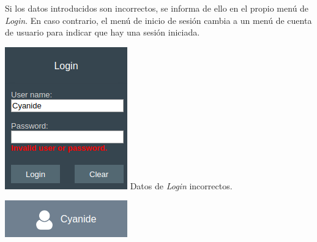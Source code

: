 \documentclass{article}
\newcommand{\myarrow}{\ding{223}}
\begin{document}
\newpage
Si los datos introducidos son incorrectos, se informa de ello en el propio menú de \textit{Login}. En caso contrario, el menú de inicio de sesión cambia a un menú de cuenta de usuario para indicar que hay una sesión iniciada.
\vspace{-12pt}
\begin{center}
    \begin{minipage}[t][][b]{.275\linewidth}
        \includegraphics[width=.91\linewidth]{login2}\newline
        Datos de \textit{Login} incorrectos.
    \end{minipage}
    \hfill
    \begin{minipage}[t][][b]{.275\linewidth}
        \includegraphics[width=.91\linewidth]{login3}
    \end{minipage}
    \raisebox{-2.33\height}{\scalebox{2}{\myarrow}}$\;$
    \begin{minipage}[t][][b]{.275\linewidth}

\end{minipage}
\end{center}
\end{document}
